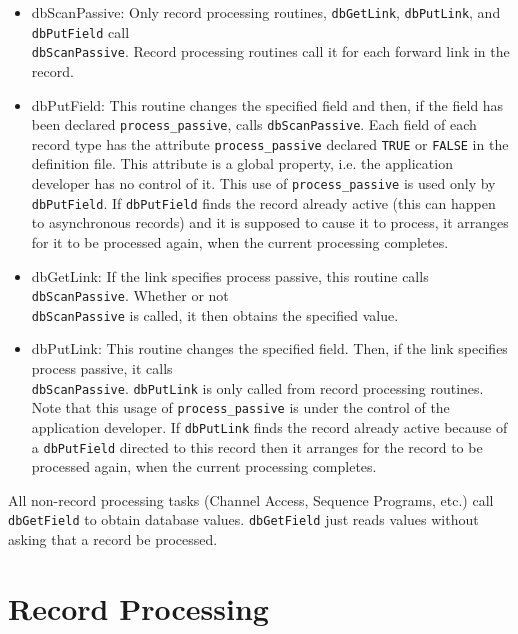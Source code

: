 \begin{itemize}\item {}dbScanPassive:  Only record processing routines, \verb|dbGetLink|, \verb|dbPutLink|, and \verb|dbPutField| call \\
\verb|dbScanPassive|. Record processing routines call it for each forward link in the record. 

\item {}dbPutField:  This routine changes the specified field and then, if the field has been declared \verb|process_passive|, 
calls \verb|dbScanPassive|. Each field of each record type has the attribute \verb|process_passive| declared \verb|TRUE| or 
\verb|FALSE| in the definition file. This attribute is a global property, i.e. the application developer has no control of it. 
This use of \verb|process_passive| is used only by \verb|dbPutField|. If \verb|dbPutField| finds the record already active 
(this can happen to asynchronous records) and it is supposed to cause it to process, it arranges for it to be processed 
again, when the current processing completes.

\item {}dbGetLink:  If the link specifies process passive, this routine calls \verb|dbScanPassive|. Whether or not \\
\verb|dbScanPassive| is called, it then obtains the specified value. 

\item {}dbPutLink:  This routine changes the specified field. Then, if the link specifies process passive, it calls \\
\verb|dbScanPassive|. \verb|dbPutLink| is only called from record processing routines. Note that this usage of 
\verb|process_passive| is under the control of the application developer. If \verb|dbPutLink| finds the record already 
active because of a \verb|dbPutField| directed to this record then it arranges for the record to be processed again,  
when the current processing completes.

\end{itemize}All non-record processing tasks (Channel Access, Sequence Programs, etc.) call \verb|dbGetField| to obtain database values. 
\verb|dbGetField| just reads values without asking that a record be processed.

\section{Record Processing}


